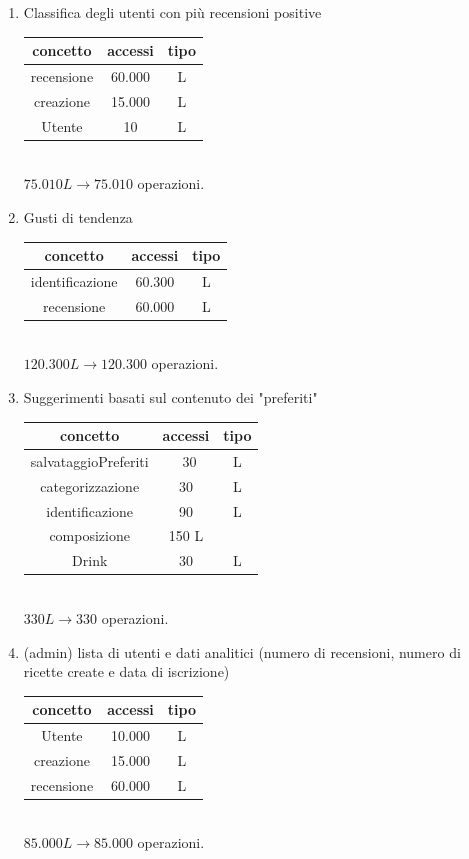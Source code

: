 \documentclass[a4paper,12pt]{report}
\begin{document}
\begin{enumerate}
    \item Classifica degli utenti con più recensioni positive\\
    \begin{tabular}{c|c|c}
    concetto & accessi & tipo\\
    \hline
        recensione & 60.000 & L\\
        creazione & 15.000 & L\\
        Utente & 10 & L\\
    \hline
    \end{tabular}
    \\ $75.010L\to75.010$ operazioni.

    \item Gusti di tendenza\\
    \begin{tabular}{c|c|c}
    concetto & accessi & tipo\\
    \hline
        identificazione & 60.300 & L\\
        recensione & 60.000 & L\\
    \hline
    \end{tabular}
    \\ $120.300L\to120.300$ operazioni.

    \item Suggerimenti basati sul contenuto dei "preferiti"\\
    \begin{tabular}{c|c|c}
    concetto & accessi & tipo\\
    \hline
        salvataggioPreferiti & ~30 & L\\
        categorizzazione & 30 & L\\
        identificazione & 90 & L\\
        composizione & 150 L\\
        Drink & 30 & L\\
    \hline
    \end{tabular}
    \\ $330L\to330$ operazioni.

    \item \normalsize(admin) lista di utenti e dati analitici \footnotesize (numero di recensioni, numero di ricette create e data di iscrizione)\normalsize\\
    \begin{tabular}{c|c|c}
    concetto & accessi & tipo\\
    \hline
        Utente & 10.000 & L\\
        creazione & 15.000 & L\\
        recensione & 60.000 & L\\
    \hline
    \end{tabular}
    \\ $85.000L\to85.000$ operazioni.


\end{enumerate}
\end{document}
